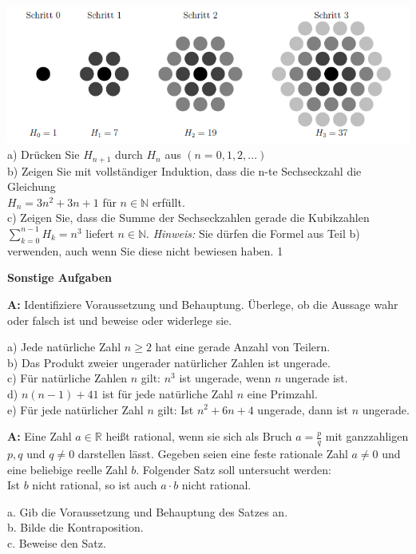 \documentclass[landscape,twocolumn,a4paper]{article}
\begin{document}
\includegraphics[scale=0.8]{bild1.png} \\

a) Drücken Sie $H_{n+1}$ durch $H_n$ aus $(n=0,1,2,...)$ \\
b) Zeigen Sie mit vollständiger Induktion, dass die n-te Sechseckzahl die Gleichung \\
 $H_n =3n^2 + 3n +1$ für 
$n \in \mathbb{N}$ erfüllt. \\
c) Zeigen Sie, dass die Summe der Sechseckzahlen gerade die Kubikzahlen
 $\sum\limits_{k=0}^{n-1} H_k = n^3$ liefert $n \in \mathbb{N}$. \textit{Hinweis:} Sie dürfen die Formel aus
 Teil b) verwenden, auch wenn Sie diese nicht bewiesen haben.
\bigskip
{}
\setcounter {y} {1}

\newpage
\textbf{Sonstige Aufgaben}
\bigskip

\textbf{A:}
Identifiziere Voraussetzung und Behauptung. Überlege, ob die Aussage wahr oder falsch ist und beweise oder widerlege sie.

a) Jede natürliche Zahl $n \ge 2$ hat eine gerade Anzahl von Teilern. \\
b) Das Produkt zweier ungerader natürlicher Zahlen ist ungerade. \\
c) Für natürliche Zahlen $n$ gilt: $n^3$ ist ungerade, wenn $n$ ungerade ist. \\
d) $n(n-1)+41$ ist für jede natürliche Zahl $n$ eine Primzahl. \\
e) Für jede natürlicher Zahl $n$ gilt: Ist $n^2 + 6n + 4$ ungerade, dann ist $n$ ungerade.
\bigskip {}

\textbf{A:}
Eine Zahl $a \in \mathbb{R}$ heißt rational, wenn sie sich als Bruch $a = \frac{p}{q}$ mit ganzzahligen $p, q$ und 
$q \neq 0$ darstellen lässt. Gegeben seien eine feste rationale Zahl $a \neq 0$ und eine beliebige reelle Zahl $b$. Folgender Satz soll untersucht werden: \\
Ist $b$ nicht rational, so ist auch $a \cdot b$ nicht rational.

a. Gib die Voraussetzung und Behauptung des Satzes an. \\
b. Bilde die Kontraposition. \\
c. Beweise den Satz.
\bigskip {}
\end{document}
